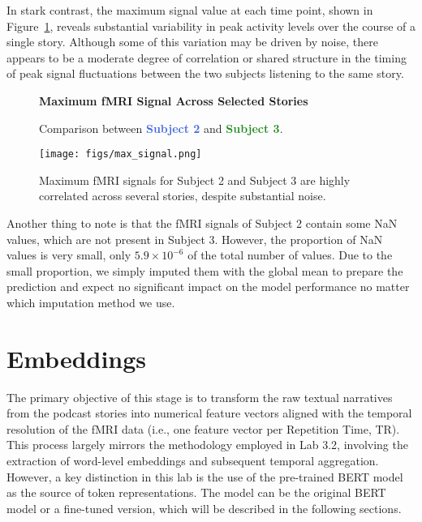 \documentclass[10pt,letterpaper]{article}
\begin{document}
In stark contrast, the maximum signal value at each time point, shown in Figure~\ref{fig:max_signal}, reveals substantial variability in peak activity levels over the course of a single story. Although some of this variation may be driven by noise, there appears to be a moderate degree of correlation or shared structure in the timing of peak signal fluctuations between the two subjects listening to the same story.

\begin{figure}[ht]
    \centering
    \parbox{\textwidth}{\centering 
        \fontsize{13pt}{13pt}\selectfont \textbf{Maximum fMRI Signal Across Selected Stories}  

        {\fontsize{11pt}{13pt}\selectfont Comparison between \textcolor{RoyalBlue}{\textbf{Subject 2}} and \textcolor{ForestGreen}{\textbf{Subject 3}}.} 
    }
    \texttt{[image: figs/max\_signal.png]}
    \caption{Maximum fMRI signals for Subject 2 and Subject 3 are highly correlated across several stories, despite substantial noise.}
    \label{fig:max_signal}
\end{figure}

Another thing to note is that the fMRI signals of Subject 2 contain some NaN values, which are not present in Subject 3. However, the proportion of NaN values is very small, only \(5.9 \times 10^{-6}\) of the total number of values. Due to the small proportion, we simply imputed them with the global mean to prepare the prediction and expect no significant impact on the model performance no matter which imputation method we use.


\section{Embeddings}

The primary objective of this stage is to transform the raw textual narratives from the podcast stories into numerical feature vectors aligned with the temporal resolution of the fMRI data (i.e., one feature vector per Repetition Time, TR). This process largely mirrors the methodology employed in Lab 3.2, involving the extraction of word-level embeddings and subsequent temporal aggregation. However, a key distinction in this lab is the use of the pre-trained BERT model \cite{devlin2019bert} as the source of token representations. The model can be the original BERT model or a fine-tuned version, which will be described in the following sections.
\end{document}

